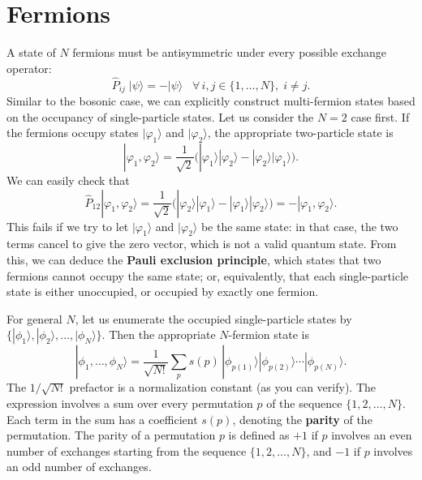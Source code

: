 \documentclass[pra,12pt]{revtex4}
\begin{document}
\section{Fermions}

A state of $N$ fermions must be antisymmetric under every possible
exchange operator:
$$\hat{P}_{ij}\; |\psi\rangle = -|\psi\rangle \;\;\; \forall\, i,j\in\{1,\dots,N\}, \; i\ne j.$$
Similar to the bosonic case, we can explicitly construct multi-fermion
states based on the occupancy of single-particle states.  Let us
consider the $N=2$ case first.  If the fermions occupy states
$|\varphi_1\rangle$ and $|\varphi_2\rangle$, the appropriate two-particle
state is
$$|\varphi_1,\varphi_2\rangle = \frac{1}{\sqrt{2}} \Big(|\varphi_1\rangle|\varphi_2\rangle - |\varphi_2\rangle|\varphi_1\rangle\Big).$$
We can easily check that
$$\hat{P}_{12} |\varphi_1,\varphi_2\rangle = \frac{1}{\sqrt{2}} \Big(|\varphi_2\rangle|\varphi_1\rangle - |\varphi_1\rangle|\varphi_2\rangle\Big) = - |\varphi_1,\varphi_2\rangle.$$
This fails if we try to let $|\varphi_1\rangle$ and
$|\varphi_2\rangle$ be the same state: in that case, the two terms
cancel to give the zero vector, which is not a valid quantum state.
From this, we can deduce the \textbf{Pauli exclusion principle}, which
states that two fermions cannot occupy the same state; or,
equivalently, that each single-particle state is either unoccupied, or
occupied by exactly one fermion.

For general $N$, let us enumerate the occupied single-particle states
by $\{|\phi_1\rangle, |\phi_2\rangle,\dots,|\phi_N\rangle\}$.  Then
the appropriate $N$-fermion state is
$$|\phi_1,\dots,\phi_N\rangle = \frac{1}{\sqrt{N!}} \sum_p s(p)\, |\phi_{p(1)}\rangle |\phi_{p(2)}\rangle \cdots |\phi_{p(N)}\rangle.$$
The $1/\sqrt{N!}$ prefactor is a normalization constant (as you can
verify).  The expression involves a sum over every permutation $p$ of
the sequence $\{1,2,\dots,N\}$.  Each term in the sum has a
coefficient $s(p)$, denoting the \textbf{parity} of the permutation.
The parity of a permutation $p$ is defined as $+1$ if $p$ involves an
even number of exchanges starting from the sequence $\{1,2,\dots,N\}$,
and $-1$ if $p$ involves an odd number of exchanges.
\end{document}
